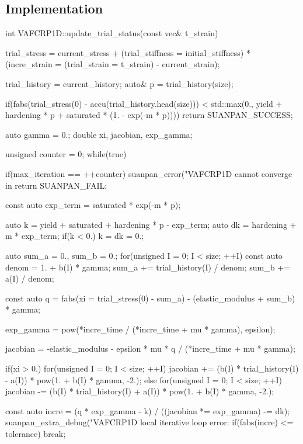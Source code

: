 \subsection{Implementation}
\begin{cppcode}
int VAFCRP1D::update_trial_status(const vec& t_strain) {
    trial_stress = current_stress + (trial_stiffness = initial_stiffness) * (incre_strain = (trial_strain = t_strain) - current_strain);

    trial_history = current_history;
    auto& p = trial_history(size);

    if(fabs(trial_stress(0) - accu(trial_history.head(size))) < std::max(0., yield + hardening * p + saturated * (1. - exp(-m * p)))) return SUANPAN_SUCCESS;

    auto gamma = 0.;
    double xi, jacobian, exp_gamma;

    unsigned counter = 0;
    while(true) {
        if(max_iteration == ++counter) {
            suanpan_error("VAFCRP1D cannot converge in %
            return SUANPAN_FAIL;
        }

        const auto exp_term = saturated * exp(-m * p);

        auto k = yield + saturated + hardening * p - exp_term;
        auto dk = hardening + m * exp_term;
        if(k < 0.) k = dk = 0.;

        auto sum_a = 0., sum_b = 0.;
        for(unsigned I = 0; I < size; ++I) {
            const auto denom = 1. + b(I) * gamma;
            sum_a += trial_history(I) / denom;
            sum_b += a(I) / denom;
        }

        const auto q = fabs(xi = trial_stress(0) - sum_a) - (elastic_modulus + sum_b) * gamma;

        exp_gamma = pow(*incre_time / (*incre_time + mu * gamma), epsilon);

        jacobian = -elastic_modulus - epsilon * mu * q / (*incre_time + mu * gamma);

        if(xi > 0.) for(unsigned I = 0; I < size; ++I) jacobian += (b(I) * trial_history(I) - a(I)) * pow(1. + b(I) * gamma, -2.);
        else for(unsigned I = 0; I < size; ++I) jacobian -= (b(I) * trial_history(I) + a(I)) * pow(1. + b(I) * gamma, -2.);

        const auto incre = (q * exp_gamma - k) / ((jacobian *= exp_gamma) -= dk);
        suanpan_extra_debug("VAFCRP1D local iterative loop error: %
        if(fabs(incre) <= tolerance) break;

}}
\end{cppcode}
